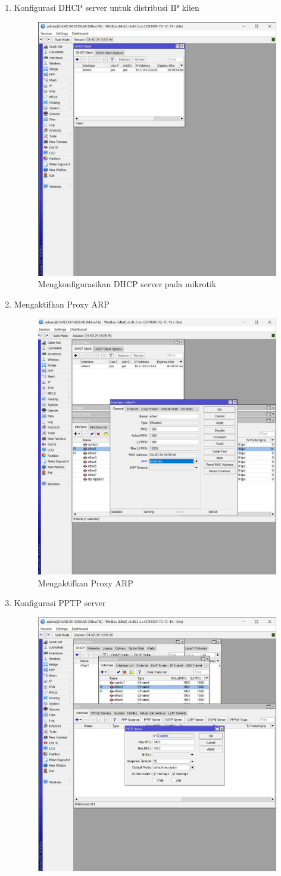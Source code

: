 \begin{enumerate}
\begin{figure}[H]
        \caption{Mengkonfigurasikan DHCP server pada mikrotik}
        \label{fig:Alamat-IP-ether}
    \end{figure}
    \item Konfigurasi DHCP server untuk distribusi IP klien 
    \begin{figure}[H]
        \centering
        \includegraphics[width=0.5\linewidth]{gambar5.jpeg}
        \caption{Mengkonfigurasikan DHCP server pada mikrotik}
        \label{fig:DHCP-server-mikrotik}
    \end{figure}
    \item Mengaktifkan Proxy ARP
    \begin{figure}[H]
        \centering
        \includegraphics[width=0.5\linewidth]{gambar6.jpeg}
        \caption{Mengaktifkan Proxy ARP}
        \label{fig:Proxy-ARP}
    \end{figure}
    \item Konfigurasi PPTP server
    \begin{figure}[H]
        \centering
        \includegraphics[width=0.5\linewidth]{gambar7.jpeg}

\end{figure}
\end{enumerate}
